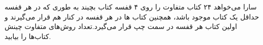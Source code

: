 \documentclass[12pt,onecolumn,a4paper]{article}
\begin{document}
سارا می‌خواهد ۲۴ کتاب متفاوت را روی ۴ قفسه کتاب بچیند به طوری که در هر قفسه حداقل یک کتاب موجود باشد، همچنین کتاب ها در هر قفسه در کنار هم قرار می‌گیرند و اولین کتاب هر قفسه در سمت چپ قرار می‌گیرد.تعداد روش‌های متفاوت چینش کتاب‌ها را بیابید.
\end{document}
